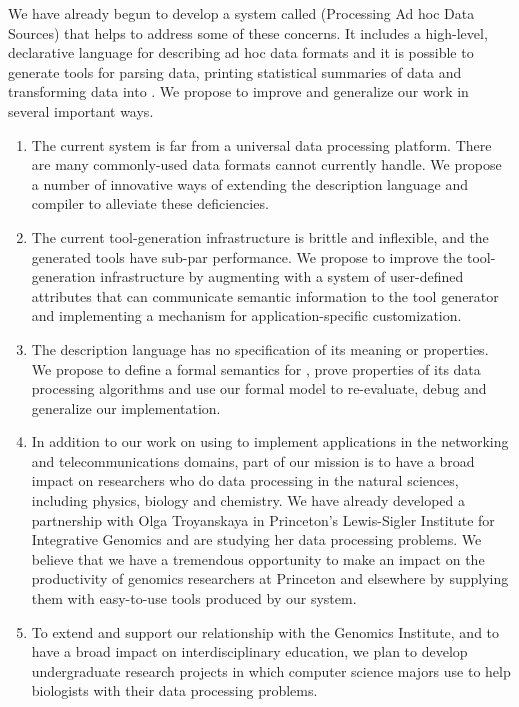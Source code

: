 \documentclass[11pt]{article}
\begin{document}
We have already begun to develop a system called \pads{} (Processing
Ad hoc Data Sources) that helps to address some of these concerns.
It includes a high-level, declarative language for describing
ad hoc data formats and it is possible to generate tools for
parsing data, printing statistical summaries of data and transforming 
data into \xml.  We propose to improve and generalize our work 
in several important ways.

\begin{enumerate}
\item The current \pads{} system is far from a universal
data processing platform.  There are many commonly-used
data formats \pads{} cannot currently handle.  We propose
a number of innovative ways of extending the \pads{} description language
and compiler to alleviate these deficiencies.
\item The current \pads{} tool-generation infrastructure is brittle and
inflexible, and the generated tools have sub-par performance.  We propose
to improve the tool-generation infrastructure by augmenting \pads{}
with a system of user-defined attributes that can communicate
semantic information to the tool generator and implementing a mechanism for 
application-specific customization.
\item The \pads{} description language has no specification of its 
meaning or properties.  We propose to define a formal semantics for 
\pads{}, prove properties of its data processing algorithms and
use our formal model to re-evaluate, debug and generalize our 
implementation.  
\item In addition to our work on using \pads{} to implement applications 
in the networking and telecommunications domains, part of our mission
is to have a broad impact on researchers who do data processing
in the natural sciences, including physics, biology and chemistry.
We have already developed a partnership with
Olga Troyanskaya in Princeton's Lewis-Sigler Institute for 
Integrative Genomics
and are studying her data processing problems.  We believe that 
we have a tremendous
opportunity to make an impact on the productivity of 
genomics researchers at Princeton
and elsewhere by supplying them with easy-to-use tools produced by our system.
\item To extend and support our relationship with the Genomics Institute,
and to have a broad impact on interdisciplinary education,
we plan to develop undergraduate research projects in which
computer science majors use \pads{} to help biologists 
with their data processing problems.  
\end{enumerate}
\end{document}
